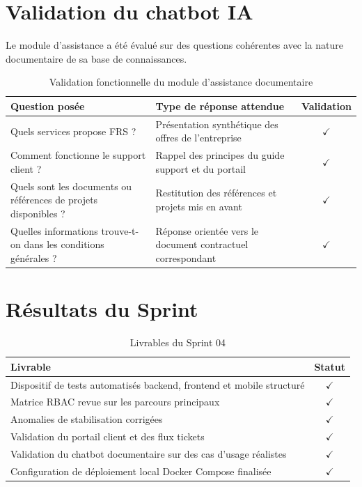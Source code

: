 \section{Validation du chatbot IA}
Le module d'assistance a été évalué sur des questions cohérentes avec la nature documentaire de sa base de connaissances.

\begin{table}[H]
\centering
\caption{Validation fonctionnelle du module d'assistance documentaire}
\label{tab:test_chatbot}
\begin{tabularx}{\textwidth}{|X|X|c|}
\hline
\textbf{Question posée} & \textbf{Type de réponse attendue} & \textbf{Validation} \\
\hline
Quels services propose FRS ? & Présentation synthétique des offres de l'entreprise & $\checkmark$ \\
\hline
Comment fonctionne le support client ? & Rappel des principes du guide support et du portail & $\checkmark$ \\
\hline
Quels sont les documents ou références de projets disponibles ? & Restitution des références et projets mis en avant & $\checkmark$ \\
\hline
Quelles informations trouve-t-on dans les conditions générales ? & Réponse orientée vers le document contractuel correspondant & $\checkmark$ \\
\hline
\end{tabularx}
\end{table}

\section{Résultats du Sprint}
\begin{table}[H]
\centering
\caption{Livrables du Sprint 04}
\label{tab:livrables_s4}
\begin{tabularx}{\textwidth}{|X|c|}
\hline
\textbf{Livrable} & \textbf{Statut} \\
\hline
Dispositif de tests automatisés backend, frontend et mobile structuré & $\checkmark$ \\
\hline
Matrice RBAC revue sur les parcours principaux & $\checkmark$ \\
\hline
Anomalies de stabilisation corrigées & $\checkmark$ \\
\hline
Validation du portail client et des flux tickets & $\checkmark$ \\
\hline
Validation du chatbot documentaire sur des cas d'usage réalistes & $\checkmark$ \\
\hline
Configuration de déploiement local Docker Compose finalisée & $\checkmark$ \\
\hline
\end{tabularx}
\end{table}

